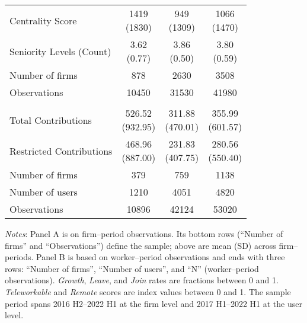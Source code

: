\begin{table}[H]
\begin{threeparttable}
\begin{tabular}{lcc@{\hspace{6pt}}c}
Centrality Score & \makecell{1419 \\ (1830)} & \makecell{949 \\ (1309)} & \makecell{1066 \\ (1470)} \\
Seniority Levels (Count) & \makecell{3.62 \\ (0.77)} & \makecell{3.86 \\ (0.50)} & \makecell{3.80 \\ (0.59)} \\
\addlinespace
\midrule
Number of firms & 878 & 2630 & 3508 \\
Observations & 10450 & 31530 & 41980 \\
        \addlinespace
        \midrule
        \addlinespace
        \multicolumn{4}{l}{\textbf{\uline{Panel B: User-level}}}\\[0.3em]
        Total Contributions & \makecell{526.52 \\ (932.95)} & \makecell{311.88 \\ (470.01)} & \makecell{355.99 \\ (601.57)} \\
Restricted Contributions & \makecell{468.96 \\ (887.00)} & \makecell{231.83 \\ (407.75)} & \makecell{280.56 \\ (550.40)} \\
\addlinespace
\midrule
Number of firms & 379 & 759 & 1138 \\
Number of users & 1210 & 4051 & 4820 \\
Observations & 10896 & 42124 & 53020 \\
        \bottomrule
        \end{tabular}
        \begin{tablenotes}[flushleft]
\footnotesize
\item \emph{Notes}: Panel A is on firm--period observations.  Its bottom rows (``Number of firms'' and ``Observations'') define the sample; above are mean (SD) across firm--periods.  Panel B is based on worker--period observations and ends with three rows: ``Number of firms'', ``Number of users'', and ``N'' (worker--period observations). \textit{Growth}, \textit{Leave}, and \textit{Join} rates are fractions between 0 and 1. \textit{Teleworkable} and \textit{Remote} scores are index values between 0 and 1. The sample period spans 2016 H2–2022 H1 at the firm level and 2017 H1–2022 H1 at the user level.
\end{tablenotes}
        \end{threeparttable}
        \end{table}
